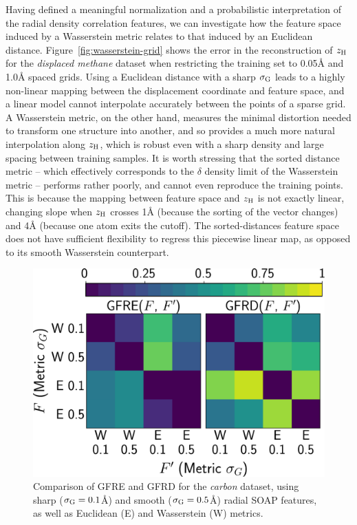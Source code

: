 Having defined a meaningful normalization and a probabilistic interpretation of the radial density correlation features, we can investigate how the feature space induced by a Wasserstein metric relates to that induced by an Euclidean distance. 
Figure~\ref{fig:wasserstein-grid} shows the error in the reconstruction of $\zh$ for the \emph{displaced methane} dataset when restricting the training set to 0.05\AA{} and 1.0\AA{} spaced grids.
Using a Euclidean distance with a sharp $\sigma_\text{G}$ leads to a highly non-linear mapping between the displacement coordinate and feature space, and a linear model cannot interpolate accurately between the points of a sparse grid. 
A Wasserstein metric, on the other hand, measures the minimal distortion needed to transform one structure into another, and so provides a much more natural interpolation along $\zh$, which is robust even with a sharp density and large spacing between training samples. 
It is worth stressing that the sorted distance metric -- which effectively corresponds to the $\delta$ density limit of the Wasserstein metric -- performs rather poorly, and cannot even reproduce the training points.
This is because the mapping between feature space and $\zh$ is not exactly linear, changing slope when $\zh$ crosses 1\AA{} (because the sorting of the vector changes)  and 4\AA{} (because one atom exits the cutoff). The sorted-distances feature space does not have sufficient flexibility to regress this piecewise linear map, as opposed to its smooth Wasserstein counterpart.

\begin{figure}
\includegraphics[width=1\linewidth]{fig/distance_comparison-delta_wasserstein-carbon-inkscaped.pdf}
\caption{Comparison of GFRE and GFRD for the \emph{carbon} dataset, using sharp ($\sigma_\text{G}=0.1$\AA{}) and smooth ($\sigma_\text{G}=0.5$\AA{}) radial SOAP features, as well as Euclidean (E) and Wasserstein (W) metrics.}
\label{fig:wasserstein-carbon}
\end{figure}

